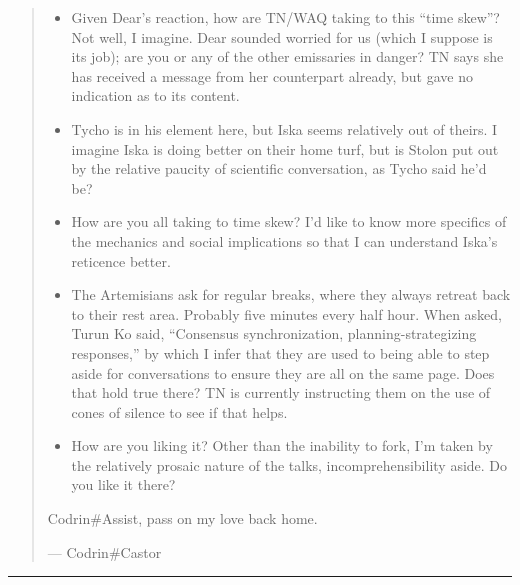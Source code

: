 \begin{quote}
\begin{itemize}
\tightlist
\item
  Given Dear's reaction, how are TN/WAQ taking to this ``time skew''? Not well, I imagine. Dear sounded worried for us (which I suppose is its job); are you or any of the other emissaries in danger? TN says she has received a message from her counterpart already, but gave no indication as to its content.
\item
  Tycho is in his element here, but Iska seems relatively out of theirs. I imagine Iska is doing better on their home turf, but is Stolon put out by the relative paucity of scientific conversation, as Tycho said he'd be?
\item
  How are you all taking to time skew? I'd like to know more specifics of the mechanics and social implications so that I can understand Iska's reticence better.
\item
  The Artemisians ask for regular breaks, where they always retreat back to their rest area. Probably five minutes every half hour. When asked, Turun Ko said, ``Consensus synchronization, planning-strategizing responses,'' by which I infer that they are used to being able to step aside for conversations to ensure they are all on the same page. Does that hold true there? TN is currently instructing them on the use of cones of silence to see if that helps.
\item
  How are you liking it? Other than the inability to fork, I'm taken by the relatively prosaic nature of the talks, incomprehensibility aside. Do you like it there?
\end{itemize}

Codrin\#Assist, pass on my love back home.

— Codrin\#Castor
\end{quote}

\begin{center}\rule{0.5\linewidth}{0.5pt}\end{center}

